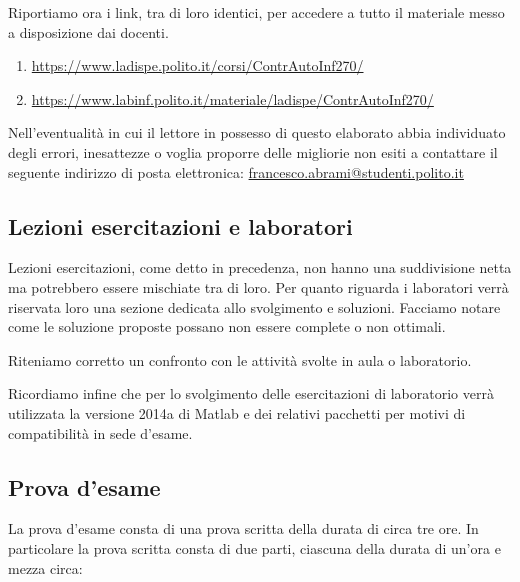 \documentclass[../main.tex]{subfiles}
\begin{document}
Riportiamo ora i link, tra di loro identici, per accedere a tutto il materiale messo a disposizione dai docenti.

\begin{enumerate}
	\item[\textbf{-}] \href{https://www.ladispe.polito.it/corsi/ContrAutoInf270/}{https://www.ladispe.polito.it/corsi/ContrAutoInf270/} 
	
	\item[\textbf{-}] \href{https://www.labinf.polito.it/materiale/ladispe/ContrAutoInf270/}{https://www.labinf.polito.it/materiale/ladispe/ContrAutoInf270/} 
	
\end{enumerate}

Nell'eventualità in cui il lettore in possesso di questo elaborato abbia individuato degli errori, inesattezze o voglia proporre delle migliorie non esiti a contattare il seguente indirizzo di posta elettronica: \href{mailto:francesco.abrami@studenti.polito.it?subject=Controlli Automatici - 18AKSOA&body= Buongiorno, 
scrivo riguardo al documento LaTex del corso di cui in oggetto.}{francesco.abrami@studenti.polito.it}

\subsection{Lezioni esercitazioni e laboratori}

Lezioni esercitazioni, come detto in precedenza, non hanno una suddivisione netta ma potrebbero essere mischiate tra di loro. Per quanto riguarda i laboratori verrà riservata loro una sezione dedicata allo svolgimento e soluzioni. Facciamo notare come le soluzione proposte possano non essere complete o non ottimali. 

Riteniamo corretto un confronto con le attività svolte in aula o laboratorio. 

Ricordiamo infine che per lo svolgimento delle esercitazioni di laboratorio verrà utilizzata la versione 2014a di Matlab e dei relativi pacchetti per motivi di compatibilità in sede d'esame.

\subsection{Prova d'esame}

La prova d'esame consta di una prova scritta della durata di circa tre ore. In particolare la prova scritta consta di due parti, ciascuna della durata di un'ora e mezza circa:
\end{document}

